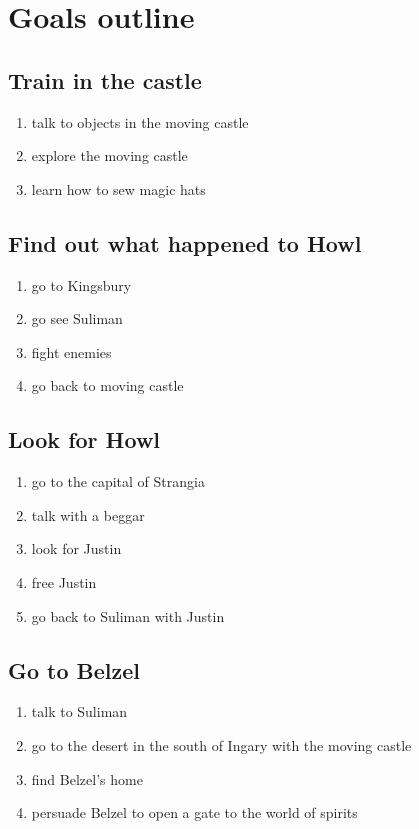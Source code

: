 \section{Goals outline}

\subsection{Train in the castle}
\begin{enumerate}
\item talk to objects in the moving castle
\item explore the moving castle
\item learn how to sew magic hats
\end{enumerate}

\subsection{Find out what happened to Howl}
\begin{enumerate}
\item go to Kingsbury
\item go see Suliman
\item fight enemies
\item go back to moving castle
\end{enumerate}

\subsection{Look for Howl}
\begin{enumerate}
\item go to the capital of Strangia
\item talk with a beggar
\item look for Justin
\item free Justin
\item go back to Suliman with Justin
\end{enumerate}

\subsection{Go to Belzel}
\begin{enumerate}
\item talk to Suliman
\item go to the desert in the south of Ingary with the moving castle
\item find Belzel’s home
\item persuade Belzel to open a gate to the world of spirits
\end{enumerate}

